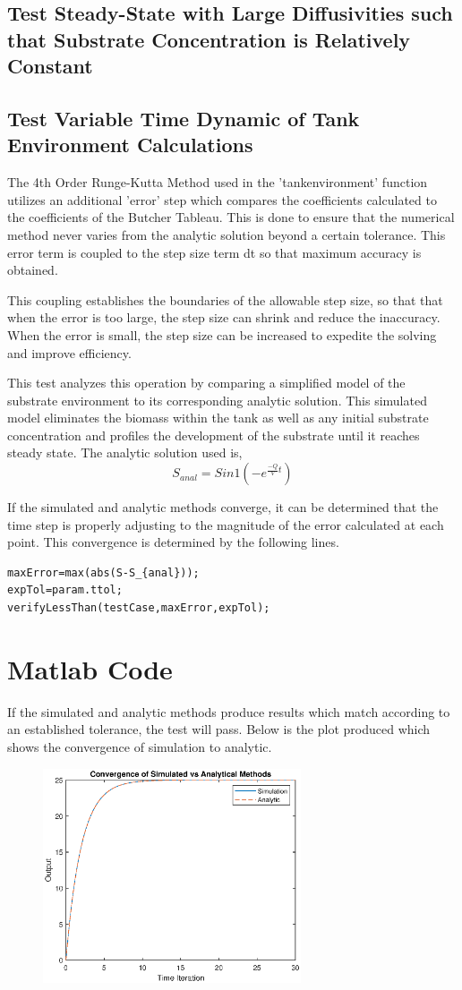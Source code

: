 \documentclass[letterpaper, twoside]{article}
\numberwithin{equation}{section}
\begin{document}
\subsection{Test Steady-State with Large Diffusivities such that Substrate Concentration is Relatively Constant}

\subsection{Test Variable Time Dynamic of Tank Environment Calculations}
The 4th Order Runge-Kutta Method used in the 'tankenvironment' function utilizes an additional 'error' step which compares the coefficients calculated to the coefficients of the Butcher Tableau. This is done to ensure that the numerical method never varies from the analytic solution beyond a certain tolerance. This error term is coupled to the step size term dt so that maximum accuracy is obtained. 

This coupling establishes the boundaries of the allowable step size, so that that when the error is too large, the step size can shrink and reduce the inaccuracy. When the error is small, the step size can be increased to expedite the solving and improve efficiency. 

This test analyzes this operation by comparing a simplified model of the substrate environment to its corresponding analytic solution. This simulated model eliminates the biomass within the tank as well as any initial substrate concentration and profiles the development of the substrate until it reaches steady state. The analytic solution used is,
\begin{equation} \label{eq: S_anal}
  S_{anal}=Sin 1{(-e^{\frac{-Q}{V}t})}
\end{equation}

If the simulated and analytic methods converge, it can be determined that the time step is properly adjusting to the magnitude of the error calculated at each point. This convergence is determined by the following lines.

\begin{lstlisting}
maxError=max(abs(S-S_{anal}));
expTol=param.ttol;
verifyLessThan(testCase,maxError,expTol);
\end{lstlisting}

\section*{Matlab Code}

If the simulated and analytic methods produce results which match according to an established tolerance, the test will pass. Below is the plot produced which shows the convergence of simulation to analytic.

\begin{figure}[H]
  \centering
  \includegraphics[read=eps, width=3in]{TimeDynamics_Figure.eps}
\end{figure}
\end{document}
